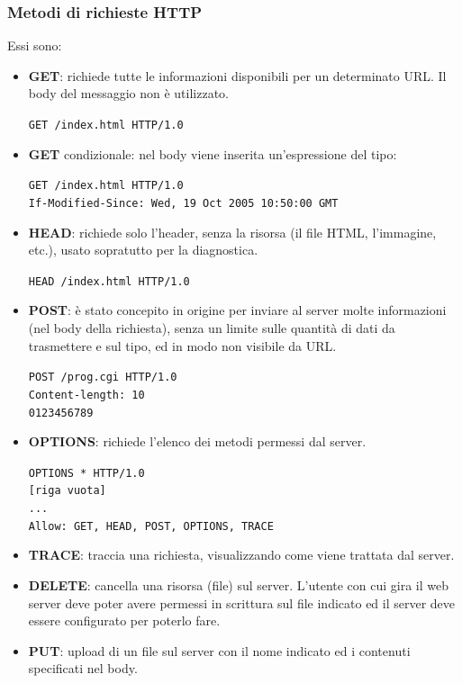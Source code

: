         \subsubsection{Metodi di richieste HTTP}
            Essi sono:
            \begin{itemize}
                \item \textbf{GET}: richiede tutte le informazioni disponibili per un determinato URL. Il body del messaggio non è utilizzato.
                
                \verb:GET /index.html HTTP/1.0:

                \item \textbf{GET} condizionale: nel body viene inserita un'espressione del tipo:
                
                \verb:GET /index.html HTTP/1.0:\\
                \verb&If-Modified-Since: Wed, 19 Oct 2005 10:50:00 GMT&

                \item \textbf{HEAD}: richiede solo l'header, senza la risorsa (il file HTML, l'immagine, etc.), usato sopratutto per la diagnostica.
                
                \verb:HEAD /index.html HTTP/1.0:

                \item \textbf{POST}: è stato concepito in origine per inviare al server molte informazioni (nel body della richiesta), senza un limite sulle quantità di dati da trasmettere e sul tipo, ed in modo non visibile da URL.

                \verb:POST /prog.cgi HTTP/1.0:\\
                \verb=Content-length: 10=\\
                \verb:0123456789:

                \item \textbf{OPTIONS}: richiede l'elenco dei metodi permessi dal server.
                
                \verb:OPTIONS * HTTP/1.0:\\
                \verb:[riga vuota]:\\
                \verb:...:\\
                \verb-Allow: GET, HEAD, POST, OPTIONS, TRACE-

                \item \textbf{TRACE}: traccia una richiesta, visualizzando come viene trattata dal server.
                \item \textbf{DELETE}: cancella una risorsa (file) sul server. L'utente con cui gira il web server deve poter avere permessi in scrittura sul file indicato ed il server deve essere configurato per poterlo fare.
                \item \textbf{PUT}: upload di un file sul server con il nome indicato ed i contenuti specificati nel body.
            \end{itemize}


